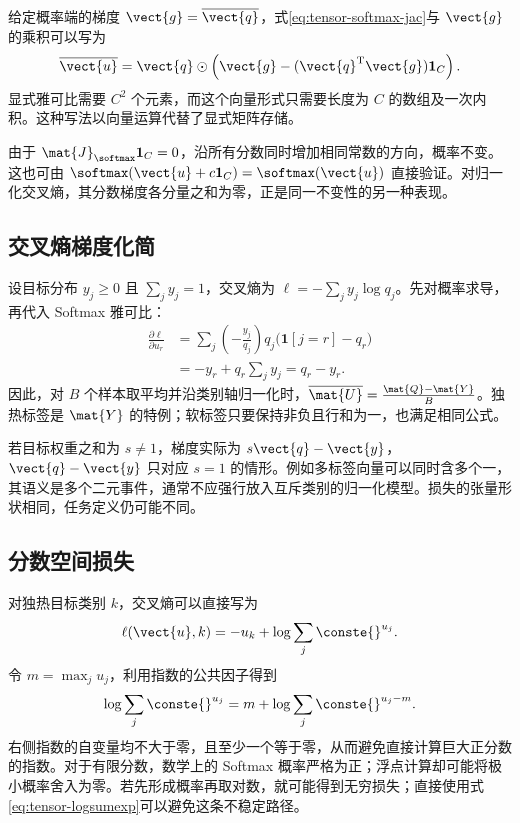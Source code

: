 \documentclass[../textbook.tex]{subfiles}
\begin{document}
给定概率端的梯度 $\vect{g}=\overline{\vect{q}}$，式\eqref{eq:tensor-softmax-jac}与 $\vect{g}$ 的乘积可以写为
\begin{equation}
 \overline{\vect{u}}=\vect{q}\odot\left(\vect{g}-(\vect{q}^{\mathrm{T}}\vect{g})\mathbf1_C\right).
\end{equation}
显式雅可比需要 $C^2$ 个元素，而这个向量形式只需要长度为 $C$ 的数组及一次内积。这种写法以向量运算代替了显式矩阵存储。

由于 $\mat{J}_{\softmax}\mathbf1_C=0$，沿所有分数同时增加相同常数的方向，概率不变。这也可由 $\softmax(\vect{u}+c\mathbf1_C)=\softmax(\vect{u})$ 直接验证。对归一化交叉熵，其分数梯度各分量之和为零，正是同一不变性的另一种表现。

\subsection{交叉熵梯度化简}
设目标分布 $y_j\ge0$ 且 $\sum_jy_j=1$，交叉熵为 $\ell=-\sum_jy_j\log q_j$。先对概率求导，再代入 Softmax 雅可比：
\begin{align}
 \frac{\partial\ell}{\partial u_r}
 &=\sum_j\left(-\frac{y_j}{q_j}\right)
            q_j\bigl(\mathbf1[j=r]-q_r\bigr)\\
 &=-y_r+q_r\sum_jy_j=q_r-y_r.
 \label{eq:tensor-ce-grad}
\end{align}
因此，对 $B$ 个样本取平均并沿类别轴归一化时，$\overline{\mat{U}}=\frac{\mat{Q}-\mat{Y}}{B}$。独热标签是 $\mat{Y}$ 的特例；软标签只要保持非负且行和为一，也满足相同公式。

若目标权重之和为 $s\ne1$，梯度实际为 $s\vect{q}-\vect{y}$，$\vect{q}-\vect{y}$ 只对应 $s=1$ 的情形。例如多标签向量可以同时含多个一，其语义是多个二元事件，通常不应强行放入互斥类别的归一化模型。损失的张量形状相同，任务定义仍可能不同。

\subsection{分数空间损失}
对独热目标类别 $k$，交叉熵可以直接写为
\begin{equation}
 \ell(\vect{u},k)=-u_k+\log\sum_j \conste{}^{u_j}.
\end{equation}
令 $m=\max_j u_j$，利用指数的公共因子得到
\begin{equation}
 \log\sum_j \conste{}^{u_j}=m+\log\sum_j \conste{}^{u_j-m}.
 \label{eq:tensor-logsumexp}
\end{equation}
右侧指数的自变量均不大于零，且至少一个等于零，从而避免直接计算巨大正分数的指数。对于有限分数，数学上的 Softmax 概率严格为正；浮点计算却可能将极小概率舍入为零。若先形成概率再取对数，就可能得到无穷损失；直接使用式\eqref{eq:tensor-logsumexp}可以避免这条不稳定路径。
\end{document}
